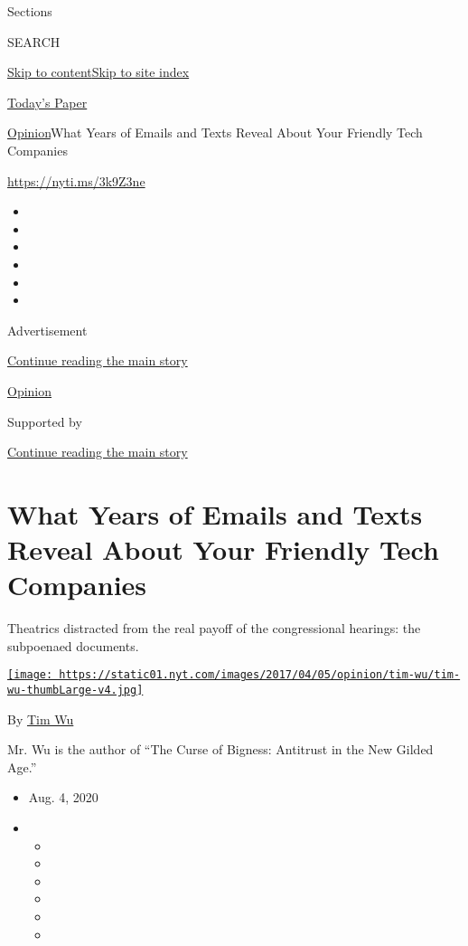 Sections

SEARCH

\protect\hyperlink{site-content}{Skip to
content}\protect\hyperlink{site-index}{Skip to site index}

\href{https://myaccount.nytimes.com/auth/login?response_type=cookie\&client_id=vi}{}

\href{https://www.nytimes.com/section/todayspaper}{Today's Paper}

\href{/section/opinion}{Opinion}\textbar{}What Years of Emails and Texts
Reveal About Your Friendly Tech Companies

\url{https://nyti.ms/3k9Z3ne}

\begin{itemize}
\item
\item
\item
\item
\item
\item
\end{itemize}

Advertisement

\protect\hyperlink{after-top}{Continue reading the main story}

\href{/section/opinion}{Opinion}

Supported by

\protect\hyperlink{after-sponsor}{Continue reading the main story}

\hypertarget{what-years-of-emails-and-texts-reveal-about-your-friendly-tech-companies}{%
\section{What Years of Emails and Texts Reveal About Your Friendly Tech
Companies}\label{what-years-of-emails-and-texts-reveal-about-your-friendly-tech-companies}}

Theatrics distracted from the real payoff of the congressional hearings:
the subpoenaed documents.

\href{https://www.nytimes.com/by/tim-wu}{\texttt{[image: https://static01.nyt.com/images/2017/04/05/opinion/tim-wu/tim-wu-thumbLarge-v4.jpg]}}

By \href{https://www.nytimes.com/by/tim-wu}{Tim Wu}

Mr. Wu is the author of ``The Curse of Bigness: Antitrust in the New
Gilded Age.''

\begin{itemize}
\item
  Aug. 4, 2020
\item
  \begin{itemize}
  \item
  \item
  \item
  \item
  \item
  \item
  \end{itemize}
\end{itemize}

